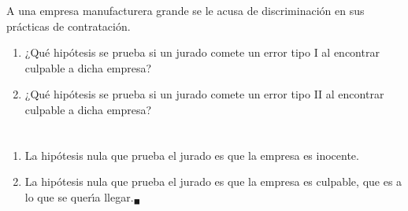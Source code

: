 \begin{enunciado}
 A una empresa manufacturera grande se le acusa de discriminaci\'on en sus pr\'acticas de contrataci\'on.
 \begin{enumerate}
  \item ¿Qu\'e hip\'otesis se prueba si un jurado comete un error tipo I al encontrar culpable a dicha empresa?
  
  \item ¿Qu\'e hip\'otesis se prueba si un jurado comete un error tipo II al encontrar culpable a dicha empresa?
 \end{enumerate}
\end{enunciado}

\begin{solucion}
 $\phantom{0}$
 \begin{enumerate}
  \item La hip\'otesis nula que prueba el jurado es que la empresa es inocente.
  
  \item La hip\'otesis nula que prueba el jurado es que la empresa es culpable, que es a lo que se quer\'{\i}a llegar.${}_{\blacksquare}$
 \end{enumerate}
\end{solucion}
